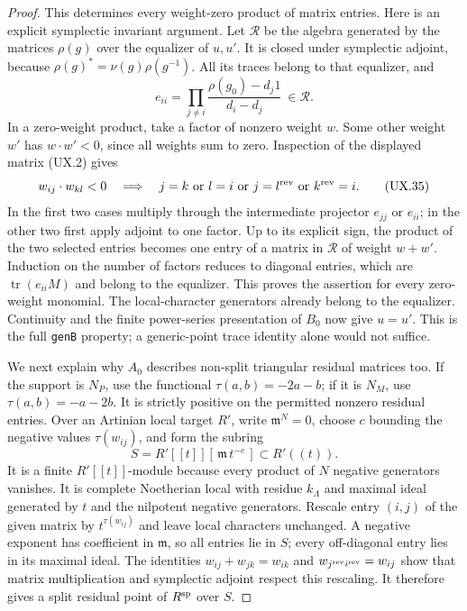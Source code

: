 \begin{proof}
This determines every weight-zero product of
matrix entries.  Here is an explicit symplectic
invariant argument.  Let $\mathcal R$ be the algebra
generated by the matrices $\rho(g)$ over the
equalizer of $u,u'$.  It is closed under symplectic
adjoint, because $\rho(g)^*=\nu(g)\rho(g^{-1})$.
All its traces belong to that equalizer, and
\[
 e_{ii}=\prod_{j\ne i}
           \frac{\rho(g_0)-d_j1}{d_i-d_j}
                  \ \in\mathcal R .
 \tag{UX.34}
\]
In a zero-weight product, take a factor of nonzero
weight $w$.  Some other weight $w'$ has
$w\cdot w'<0$, since all weights sum to zero.
Inspection of the displayed matrix (UX.2) gives
\[
 w_{ij}\cdot w_{kl}<0\quad\Longrightarrow\quad
 j=k\ \hbox{or}\ l=i\ \hbox{or}\
 j=l^{\rm rev}\ \hbox{or}\ k^{\rm rev}=i .
 \tag{UX.35}
\]
In the first two cases multiply through the
intermediate projector $e_{jj}$ or $e_{ii}$;
in the other two first apply adjoint to one
factor.  Up to its explicit sign, the product
of the two selected entries becomes one entry
of a matrix in $\mathcal R$ of weight $w+w'$.
Induction on the number of factors reduces to
diagonal entries, which are
$\operatorname{tr}(e_{ii}M)$ and belong to the
equalizer.  This proves the assertion for every
zero-weight monomial.  The local-character
generators already belong to the equalizer.
Continuity and the finite power-series presentation
of $B_0$ now give $u=u'$.  This is the full
\texttt{genB} property; a generic-point trace
identity alone would not suffice.

We next explain why $A_0$ describes non-split
triangular residual matrices too.  If the support
is $N_P$, use the functional
$\tau(a,b)=-2a-b$; if it is $N_M$, use
$\tau(a,b)=-a-2b$.  It is strictly positive on
the permitted nonzero residual entries.  Over an
Artinian local target $R'$, write
$\mathfrak m^N=0$, choose $c$ bounding the negative
values $\tau(w_{ij})$, and form the subring
\[
 S=R'[[t]][\,\mathfrak m\,t^{-c}\,]
                         \subset R'((t)).
 \tag{UX.36}
\]
It is a finite $R'[[t]]$-module because every
product of $N$ negative generators vanishes.
It is complete Noetherian local with residue
$k_\Lambda$ and maximal ideal generated by $t$
and the nilpotent negative generators.  Rescale
entry $(i,j)$ of the given matrix by
$t^{\tau(w_{ij})}$ and leave local characters
unchanged.  A negative exponent has coefficient
in $\mathfrak m$, so all entries lie in $S$;
every off-diagonal entry lies in its maximal
ideal.  The identities
$w_{ij}+w_{jk}=w_{ik}$ and
$w_{j^{\rm rev}i^{\rm rev}}=w_{ij}$ show that
matrix multiplication and symplectic adjoint
respect this rescaling.  It therefore gives a
split residual point of $R^{\rm sp}$ over $S$.


\end{proof}
